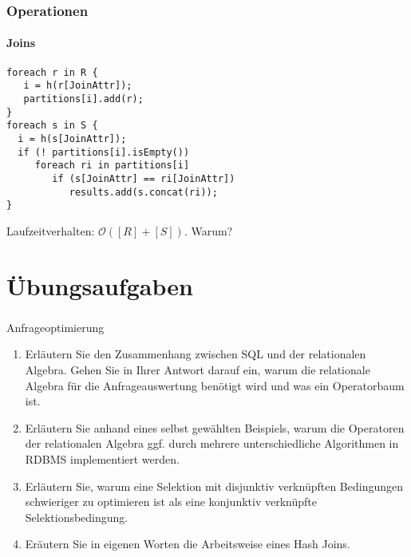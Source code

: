 \begin{frame}[fragile]
	\frametitle{Operationen}
	\framesubtitle{Joins}
  \abs
\begin{lstlisting}
foreach r in R { 
   i = h(r[JoinAttr]);
   partitions[i].add(r);    
}
foreach s in S {
  i = h(s[JoinAttr]); 
  if (! partitions[i].isEmpty())
     foreach ri in partitions[i] 
        if (s[JoinAttr] == ri[JoinAttr])
           results.add(s.concat(ri));
}
\end{lstlisting}
\pause
\abs
Laufzeitverhalten: $\mathcal{O}([R]+ [S])$. Warum? 
\end{frame}

\section*{Übungsaufgaben}
\begin{frame}[t]
	\frametitle{\insertsection}
	
	\begin{alertblock}{Anfrageoptimierung}
		\begin{enumerate}
			\item Erläutern Sie den Zusammenhang zwischen SQL und der relationalen Algebra. Gehen Sie in Ihrer Antwort darauf ein, warum die relationale Algebra für die Anfrageauswertung benötigt wird und was ein Operatorbaum ist.
			\item Erläutern Sie anhand eines selbst gewählten Beispiels, warum die Operatoren der relationalen Algebra ggf. durch mehrere unterschiedliche Algorithmen in RDBMS implementiert werden.
			\item Erläutern Sie, warum eine Selektion mit disjunktiv verknüpften Bedingungen schwieriger zu optimieren ist als eine konjunktiv verknüpfte Selektionsbedingung.
			\item Eräutern Sie in eigenen Worten die Arbeitsweise eines Hash Joins.			
		\end{enumerate}
	\end{alertblock}
\end{frame}

